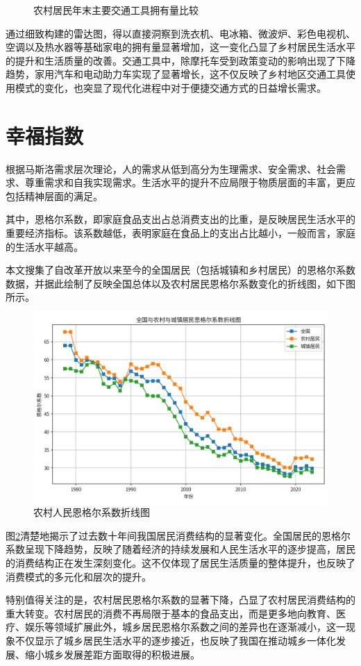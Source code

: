 \begin{figure}[H]
\begin{minipage}{0.43\textwidth}
        \caption{农村居民年末主要交通工具拥有量比较}
        \label{fig:vehicles}
    \end{minipage}
\end{figure}


通过细致构建的雷达图，得以直接洞察到洗衣机、电冰箱、微波炉、彩色电视机、空调以及热水器等基础家电的拥有量显著增加，这一变化凸显了乡村居民生活水平的提升和生活质量的改善。交通工具中，除摩托车受到政策变动的影响出现了下降趋势，家用汽车和电动助力车实现了显著增长，这不仅反映了乡村地区交通工具使用模式的变化，也突显了现代化进程中对于便捷交通方式的日益增长需求。

\section{幸福指数}

根据马斯洛需求层次理论，人的需求从低到高分为生理需求、安全需求、社会需求、尊重需求和自我实现需求。生活水平的提升不应局限于物质层面的丰富，更应包括精神层面的满足。

其中，恩格尔系数，即家庭食品支出占总消费支出的比重，是反映居民生活水平的重要经济指标。该系数越低，表明家庭在食品上的支出占比越小，一般而言，家庭的生活水平越高。

本文搜集了自改革开放以来至今的全国居民（包括城镇和乡村居民）的恩格尔系数数据\cite{china-engel-coefficients}，并据此绘制了反映全国总体以及农村居民恩格尔系数变化的折线图，如下图所示。

\begin{figure}[H]
    \centering
    \includegraphics[width=0.65\linewidth]{figures/29.png}
    \caption{农村人民恩格尔系数折线图}
    \label{fig:Engel_coefficient_village}
\end{figure}

图\ref{fig:Engel_coefficient_village}清楚地揭示了过去数十年间我国居民消费结构的显著变化。全国居民的恩格尔系数呈现下降趋势，反映了随着经济的持续发展和人民生活水平的逐步提高，居民的消费结构正在发生深刻变化。这不仅体现了居民生活质量的整体提升，也反映了消费模式的多元化和层次的提升。

特别值得关注的是，农村居民恩格尔系数的显著下降，凸显了农村居民消费结构的重大转变。农村居民的消费不再局限于基本的食品支出，而是更多地向教育、医疗、娱乐等领域扩展此外，城乡居民恩格尔系数之间的差异也在逐渐减小，这一现象不仅显示了城乡居民生活水平的逐步接近，也反映了我国在推动城乡一体化发展、缩小城乡发展差距方面取得的积极进展。